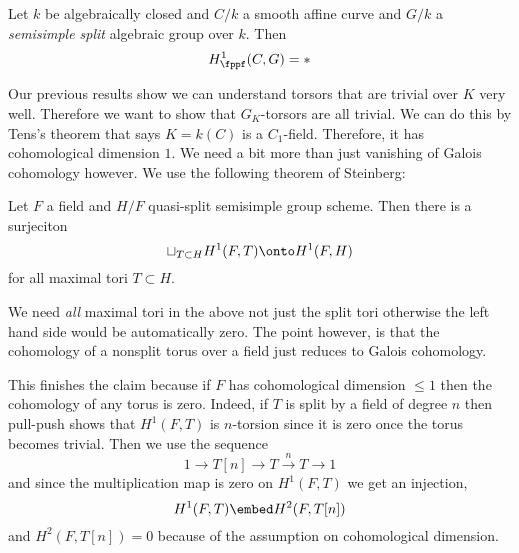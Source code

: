\documentclass{article}
\begin{document}
\begin{prop}
Let $k$ be algebraically closed and $C/k$ a smooth affine curve and $G/k$ a \textit{semisimple split} algebraic group over $k$. Then
\[ H^1_{\fppf}(C, G) = * \]
\end{prop}

Our previous results show we can understand torsors that are trivial over $K$ very well. Therefore we want to show that $G_K$-torsors are all trivial. We can do this by Tens's theorem that says $K = k(C)$ is a $C_1$-field. Therefore, it has cohomological dimension $1$. We need a bit more than just vanishing of Galois cohomology however. We use the following theorem of Steinberg:

\begin{theorem}[Steinberg]
Let $F$ a field and $H / F$ quasi-split semisimple group scheme. Then there is a surjeciton
\[ \sqcup_{T \subset H} H^1(F, T) \onto H^1(F, H) \]
for all maximal tori $T \subset H$. 
\end{theorem}

\begin{rmk}
We need \textit{all} maximal tori in the above not just the split tori otherwise the left hand side would be automatically zero. The point however, is that  the cohomology of a nonsplit torus over a field just reduces to Galois cohomology.
\end{rmk}

This finishes the claim because if $F$ has cohomological dimension $\le 1$ then the cohomology of any torus is zero. Indeed, if $T$ is split by a field of degree $n$ then pull-push shows that $H^1(F, T)$ is $n$-torsion since it is zero once the torus becomes trivial. Then we use the sequence
\[ 1 \to T[n] \to T \xrightarrow{n} T \to 1 \]
and since the multiplication map is zero on $H^1(F, T)$ we get an injection,
\[ H^1(F, T) \embed H^2(F, T[n]) \] 
and $H^2(F, T[n]) = 0$ because of the assumption on cohomological dimension. 
\end{document}
